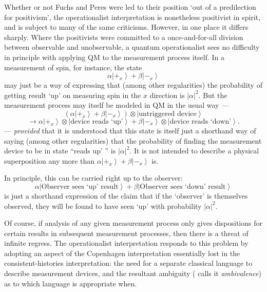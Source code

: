 \documentclass[12pt]{article}
\newcommand{\be}{\begin{equation}}
\newcommand{\ee}{\end{equation}}
\newcommand{\ket}[1]{\ensuremath{\left|  #1 \right\rangle}}
\newcommand{\tpk}[2]{\ensuremath{\ket{#1}\!\otimes\!\ket{#2}}}
\begin{document}
Whether or not Fuchs and Peres were led to their position `out of a predilection for positivism', the operationalist interpretation is nonetheless positivist in spirit, and is subject to many of the same criticisms. However, in one place it differs sharply. Where the positivists were committed to a once-and-for-all division between observable and unobservable, a quantum operationalist sees no difficulty in principle with applying QM to the measurement process itself. In a measurement of spin, for instance, the state
\be
\alpha\ket{+_x}+\beta \ket{-_x}
\ee
may just be a way of expressing that (among other regularities)  the probability of getting result `up' on measuring spin in the $x$ direction is $|\alpha|^2$. But the measurement process may itself be modeled in QM in the usual way ---
\[
(\alpha\ket{+_x}+\beta \ket{-_x})\otimes\ket{\mathrm{\mbox{untriggered device}}}
\]
\be
\longrightarrow
\alpha \tpk{+_x}{\mathrm{\mbox{device reads `up'}}}
+
\beta
\tpk{-_x}{\mathrm{\mbox{device reads `down'}}}.
\ee
--- \emph{provided} that it is understood that this state is itself just a shorthand way of saying (among other regularities)  that the probability of finding the measurement device to be in state ``reads up' '' is $|\alpha|^2$. It is not intended to describe a physical superposition any more than $\alpha\ket{+_x}+\beta \ket{-_x}$ is. 

In principle, this can be carried right up to the observer:
\be
\alpha\ket{\mathrm{\mbox{Observer sees `up' result}}}
+
\beta\ket{\mathrm{\mbox{Observer sees `down' result}}}
\ee
is just a shorthand expression of the claim that if the `observer' is themselves observed, they will be found to have seen `up' with probability $|\alpha|^2$.

Of course, if analysis of any given measurement process only gives dispositions for certain results in subsequent measurement processes, then
there is a threat of infinite regress. The operationalist interpretation responds to this problem by adopting an aspect of the Copenhagen interpretation essentially lost in the consistent-histories interpretation: the need for a separate classical language to describe measurement devices, and the resultant ambiguity ( calls it \emph{ambivalence}) as to which language is appropriate when.
\end{document}
